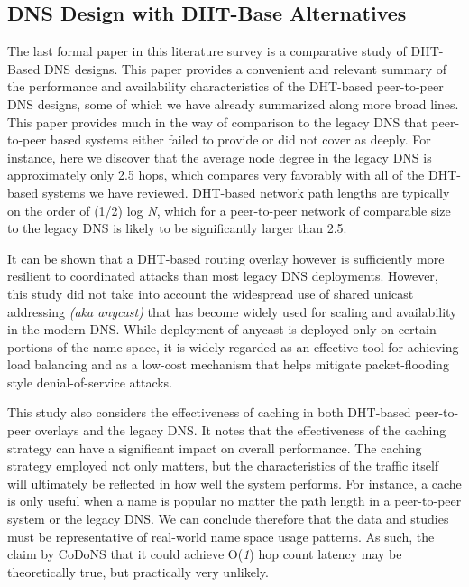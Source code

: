 \documentclass[sigconf]{acmart}
\begin{document}
\subsection{DNS Design with DHT-Base Alternatives}

The last formal paper in this literature survey is a comparative study
of DHT-Based DNS designs.\cite{pappas_comparative_2006}  This paper
provides a convenient and relevant summary of the performance and
availability characteristics of the DHT-based peer-to-peer DNS designs,
some of which we have already summarized along more broad lines.  This
paper provides much in the way of comparison to the legacy DNS that
peer-to-peer based systems either failed to provide or did not cover as
deeply.  For instance, here we discover that the average node degree in
the legacy DNS is approximately only 2.5 hops, which compares very
favorably with all of the DHT-based systems we have reviewed.  DHT-based
network path lengths are typically on the order of (1/2) log \emph{N},
which for a peer-to-peer network of comparable size to the legacy DNS is
likely to be significantly larger than 2.5.

It can be shown that a DHT-based routing overlay however is sufficiently
more resilient to coordinated attacks than most legacy DNS deployments.
However, this study did not take into account the widespread use of
shared unicast addressing \emph{(aka anycast)} that has become widely
used for scaling and availability in the modern
DNS.\cite{hardie_distributing_2002}  While deployment of anycast is
deployed only on certain portions of the name space, it is widely
regarded as an effective tool for achieving load balancing and as a
low-cost mechanism that helps mitigate packet-flooding style
denial-of-service attacks.

This study also considers the effectiveness of caching in both DHT-based
peer-to-peer overlays and the legacy DNS.  It notes that the
effectiveness of the caching strategy can have a significant impact on
overall performance.  The caching strategy employed not only matters,
but the characteristics of the traffic itself will ultimately be
reflected in how well the system performs.  For instance, a cache is
only useful when a name is popular no matter the path length in a
peer-to-peer system or the legacy DNS.  We can conclude therefore that
the data and studies must be representative of real-world name space
usage patterns.  As such, the claim by CoDoNS that it could achieve
O(\emph{1}) hop count latency may be theoretically true, but
practically very unlikely.
\end{document}
